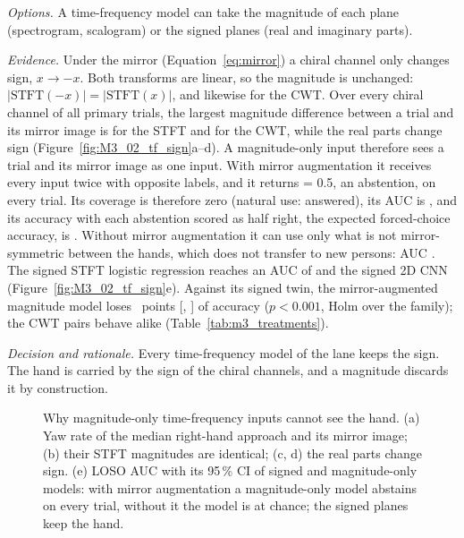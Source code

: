 \emph{Options.} A time-frequency model can take the magnitude of each plane (spectrogram, scalogram) or the signed planes (real and imaginary parts).

\emph{Evidence.} Under the mirror (Equation~\ref{eq:mirror}) a chiral channel only changes sign, $x \to -x$.
Both transforms are linear, so the magnitude is unchanged: $|\mathrm{STFT}(-x)| = |\mathrm{STFT}(x)|$, and likewise for the CWT.
Over every chiral channel of all primary trials, the largest magnitude difference between a trial and its mirror image is  for the STFT and  for the CWT, while the real parts change sign (Figure~\ref{fig:M3_02_tf_sign}a--d).
A magnitude-only input therefore sees a trial and its mirror image as one input.
With mirror augmentation it receives every input twice with opposite labels, and it returns \pright{} = 0.5, an abstention, on every trial.
Its coverage is therefore zero (natural use:  answered), its AUC is , and its accuracy with each abstention scored as half right, the expected forced-choice accuracy, is .
Without mirror augmentation it can use only what is not mirror-symmetric between the hands, which does not transfer to new persons: AUC .
The signed STFT logistic regression reaches an AUC of  and the signed 2D CNN  (Figure~\ref{fig:M3_02_tf_sign}e).
Against its signed twin, the mirror-augmented magnitude model loses ~points [, ] of accuracy ($p < 0.001$, Holm over the  family); the CWT pairs behave alike (Table~\ref{tab:m3_treatments}).

\emph{Decision and rationale.} Every time-frequency model of the lane keeps the sign. The hand is carried by the sign of the chiral channels, and a magnitude discards it by construction.

\begin{figure}[tbp]
  \centering
  \caption{Why magnitude-only time-frequency inputs cannot see the hand. (a) Yaw rate of the median right-hand approach and its mirror image; (b) their STFT magnitudes are identical; (c, d) the real parts change sign. (e) LOSO AUC with its 95\,\% CI of signed and magnitude-only models: with mirror augmentation a magnitude-only model abstains on every trial, without it the model is at chance; the signed planes keep the hand.}
  \label{fig:M3_02_tf_sign}\label{fig:app:m3-tfsign}
\end{figure}

